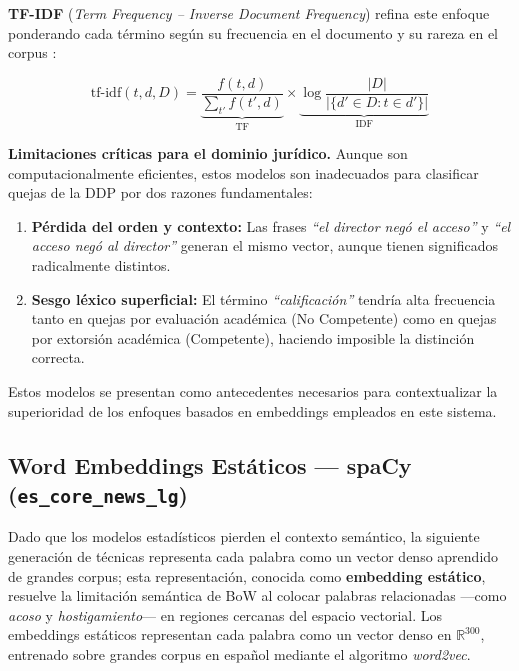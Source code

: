 \textbf{TF-IDF} (\textit{Term Frequency -- Inverse Document Frequency}) refina
este enfoque ponderando cada término según su frecuencia en el documento y su
rareza en el corpus \cite{manning2008}:

\begin{equation}
  \text{tf-idf}(t, d, D)
  = \underbrace{\frac{f(t, d)}{\sum_{t'} f(t', d)}}_{\text{TF}}
    \times
    \underbrace{\log \frac{|D|}{|\{d' \in D : t \in d'\}|}}_{\text{IDF}}
  \label{eq:tfidf}
\end{equation}

\noindent\textbf{Limitaciones críticas para el dominio jurídico.} Aunque son
computacionalmente eficientes, estos modelos son inadecuados para clasificar
quejas de la DDP por dos razones fundamentales:

\begin{enumerate}
  \item \textbf{Pérdida del orden y contexto:} Las frases \textit{``el director
        negó el acceso''} y \textit{``el acceso negó al director''} generan el
        mismo vector, aunque tienen significados radicalmente distintos.
  \item \textbf{Sesgo léxico superficial:} El término \textit{``calificación''}
        tendría alta frecuencia tanto en quejas por evaluación académica (No
        Competente) como en quejas por extorsión académica (Competente), haciendo
        imposible la distinción correcta.
\end{enumerate}

Estos modelos se presentan como antecedentes necesarios para contextualizar la
superioridad de los enfoques basados en embeddings empleados en este sistema.

\subsection{Word Embeddings Estáticos — spaCy (\texttt{es\_core\_news\_lg})}

Dado que los modelos estadísticos pierden el contexto semántico, la siguiente
generación de técnicas representa cada palabra como un vector denso aprendido
de grandes corpus; esta representación, conocida como \textbf{embedding
estático}, resuelve la limitación semántica de BoW al colocar palabras
relacionadas —como \textit{acoso} y \textit{hostigamiento}— en regiones cercanas
del espacio vectorial. Los embeddings estáticos representan cada palabra como un
vector denso en $\mathbb{R}^{300}$, entrenado sobre grandes corpus en español
mediante el algoritmo \textit{word2vec}.\cite{mikolov2013}

